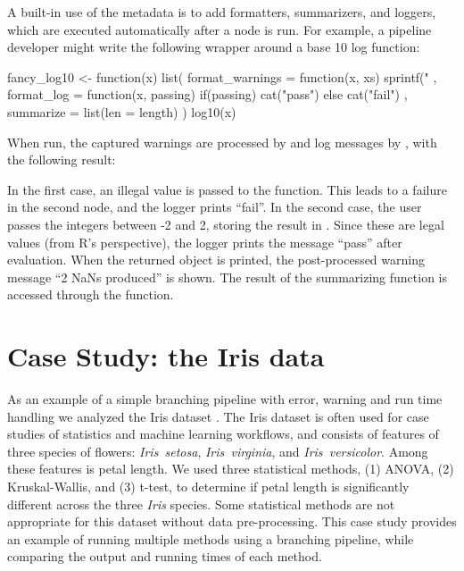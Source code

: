 A built-in use of the metadata is to add formatters, summarizers, and loggers,
which are executed automatically after a node is run. For example, a pipeline
developer might write the following wrapper around a base 10 log function:

\begin{example}
fancy_log10 <- function(x){
  list(
    format_warnings = function(x, xs) {
      sprintf("%
    },
    format_log = function(x, passing) {
      if(passing){
        cat("pass\n")
      } else {
        cat("fail\n")
      }
    },
    summarize = list(len = length)
  )
  log10(x)
}
\end{example}

When run, the captured warnings are processed by  and log messages by , with the following result:


In the first case, an illegal value is passed to the 
function.  This leads to a failure in the second node, and the logger prints
``fail''. In the second case, the user passes the integers between -2 and 2,
storing the result in .  Since these are legal values (from R's
perspective), the logger prints the message ``pass'' after evaluation. When the
returned object is printed, the post-processed warning message ``2 NaNs
produced'' is shown. The result of the summarizing function is accessed through
the  function.


\section{Case Study: the Iris data}

As an example of a simple branching  pipeline with error,
warning and run time handling we analyzed the Iris dataset
\citep{anderson1936species, fisher1936use}.  The Iris dataset is often used for
case studies of statistics and machine learning workflows, and consists of
features of three species of flowers: \textit{Iris~setosa},
\textit{Iris~virginia}, and \textit{Iris~versicolor}.  Among these features is
petal length. We used three statistical methods, (1) ANOVA, (2) Kruskal-Wallis,
and (3) t-test, to determine if petal length is significantly different across
the three \textit{Iris} species.  Some statistical methods are not appropriate
for this dataset without data pre-processing. This case study provides an
example of running multiple methods using a branching 
pipeline, while comparing the output and running times of each method.


